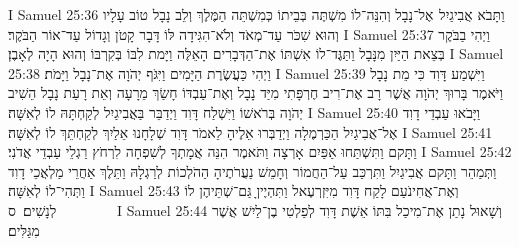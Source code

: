 I Samuel 25:36	וַתָּבֹא אֲבִיגַיִל  אֶל־נָבָל וְהִנֵּה־לוֹ מִשְׁתֶּה בְּבֵיתוֹ כְּמִשְׁתֵּה הַמֶּלֶךְ וְלֵב נָבָל טוֹב עָלָיו וְהוּא שִׁכֹּר עַד־מְאֹד וְלֹא־הִגִּידָה לּוֹ דָּבָר קָטֹן וְגָדוֹל עַד־אוֹר הַבֹּקֶר׃
I Samuel 25:37	וַיְהִי בַבֹּקֶר בְּצֵאת הַיַּיִן מִנָּבָל וַתַּגֶּד־לוֹ אִשְׁתּוֹ אֶת־הַדְּבָרִים הָאֵלֶּה וַיָּמת לִבּוֹ בְּקִרְבּוֹ וְהוּא הָיָה לְאָבֶן׃
I Samuel 25:38	וַיְהִי כַּעֲשֶׂרֶת הַיָּמִים וַיִּגֹּף יְהֹוָה אֶת־נָבָל וַיָּמֹת׃
I Samuel 25:39	וַיִּשְׁמַע דָּוִד כִּי מֵת נָבָל וַיֹּאמֶר בָּרוּךְ יְהֹוָה אֲשֶׁר רָב אֶת־רִיב חֶרְפָּתִי מִיַּד נָבָל וְאֶת־עַבְדּוֹ חָשַׂךְ מֵרָעָה וְאֵת רָעַת נָבָל הֵשִׁיב יְהֹוָה בְּרֹאשׁוֹ וַיִּשְׁלַח דָּוִד וַיְדַבֵּר בַּאֲבִיגַיִל לְקַחְתָּהּ לוֹ לְאִשָּׁה׃
I Samuel 25:40	וַיָּבֹאוּ עַבְדֵי דָוִד אֶל־אֲבִיגַיִל הַכַּרְמֶלָה וַיְדַבְּרוּ אֵלֶיהָ לֵאמֹר דָּוִד שְׁלָחָנוּ אֵלַיִךְ לְקַחְתֵּךְ לוֹ לְאִשָּׁה׃
I Samuel 25:41	וַתָּקם וַתִּשְׁתַּחוּ אַפַּיִם אָרְצָה וַתֹּאמֶר הִנֵּה אֲמָתְךָ לְשִׁפְחָה לִרְחֹץ רַגְלֵי עַבְדֵי אֲדֹנִי׃
I Samuel 25:42	וַתְּמַהֵר וַתָּקם אֲבִיגַיִל וַתִּרְכַּב עַל־הַחֲמוֹר וְחָמֵשׁ נַעֲרֹתֶיהָ הַהֹלְכוֹת לְרַגְלָהּ וַתֵּלֶךְ אַחֲרֵי מַלְאֲכֵי דָוִד וַתְּהִי־לוֹ לְאִשָּׁה׃
I Samuel 25:43	וְאֶת־אֲחִינֹעַם לָקַח דָּוִד מִיִּזְרְעֶאל וַתִּהְיֶיןָ גַּם־שְׁתֵּיהֶן לוֹ לְנָשִׁים׃ {ס}        
I Samuel 25:44	וְשָׁאוּל נָתַן אֶת־מִיכַל בִּתּוֹ אֵשֶׁת דָּוִד לְפַלְטִי בֶן־לַיִשׁ אֲשֶׁר מִגַּלִּים׃
